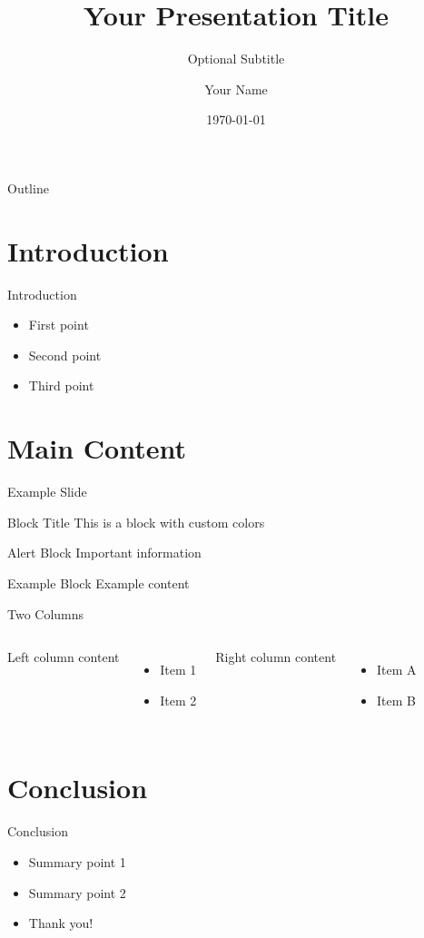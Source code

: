 \documentclass[aspectratio=169]{beamer}
\title{Your Presentation Title}
\subtitle{Optional Subtitle}
\author{Your Name}
\institute{Your Institution}
\date{\today}
\begin{document}
\begin{frame}
  \titlepage
\end{frame}

\begin{frame}{Outline}
  \tableofcontents
\end{frame}

\section{Introduction}

\begin{frame}{Introduction}
  \begin{itemize}
    \item First point
    \item Second point
    \item Third point
  \end{itemize}
\end{frame}

\section{Main Content}

\begin{frame}{Example Slide}
  \begin{block}{Block Title}
    This is a block with custom colors
  \end{block}
  
  \begin{alertblock}{Alert Block}
    Important information
  \end{alertblock}
  
  \begin{exampleblock}{Example Block}
    Example content
  \end{exampleblock}
\end{frame}

\begin{frame}{Two Columns}
  \begin{columns}
    Left column content
    \begin{itemize}
      \item Item 1
      \item Item 2
    \end{itemize}
    
    Right column content
    \begin{itemize}
      \item Item A
      \item Item B
    \end{itemize}
  \end{columns}
\end{frame}

\section{Conclusion}

\begin{frame}{Conclusion}
  \begin{itemize}
    \item Summary point 1
    \item Summary point 2
    \item Thank you!
  \end{itemize}
\end{frame}
\end{document}
